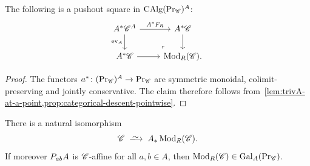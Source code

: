 \documentclass[english,svgnames,table]{article}
\begin{document}
    \begin{corollary}
    \label{cor:categorical-descent}
        The following is a pushout square in $\operatorname{CAlg}(\operatorname{Pr}_{\mathscr{C}})^A$:
        \begin{equation*}
            \begin{tikzcd}
                {A^* \cC^A} & {A^* \cC} \\
                {A^* \cC} & {\Mod_R(\cC).}
                \arrow["{A^* F_R}", from=1-1, to=1-2]
                \arrow["{\ev_A}"', from=1-1, to=2-1]
                \arrow[from=1-2, to=2-2]
                \arrow[from=2-1, to=2-2]
                \arrow["\lrcorner"{anchor=center, pos=0.125, rotate=180}, draw=none, from=2-2, to=1-1]
            \end{tikzcd}
        \end{equation*}
    \end{corollary}
    \begin{proof}
        The functors $a^* \colon (\operatorname{Pr}_{\mathscr{C}})^A \to \operatorname{Pr}_{\mathscr{C}}$ are symmetric monoidal, colimit-preserving and jointly conservative. The claim therefore follows from~\cref{lem:trivA-at-a-point,prop:categorical-descent-pointwise}.
    \end{proof}

    \begin{theorem}
    \label{thm:Galois-descent}
        There is a natural isomorphism 
        \begin{equation*}
            \cC \;\isotoo\; A_* \Mod_R(\cC).
        \end{equation*}
        If moreover $P_{ab} A$ is $\mathscr{C}$-affine for all $a,b \in A$, then $\operatorname{Mod}_R(\mathscr{C}) \in \mathrm{Gal}_A(\operatorname{Pr}_{\mathscr{C}})$.
    \end{theorem}
\end{document}
